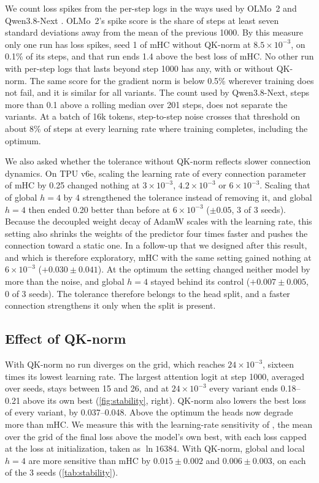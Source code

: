 \documentclass[11pt, a4paper]{article}
\newcommand{\lr}[1]{\ensuremath{#1 \times 10^{-3}}}
\begin{document}
We count loss spikes from the per-step logs in the ways used by OLMo~2 and Qwen3.8-Next \citep{olmo2024olmo2, qiu2026qwen38next}.
OLMo~2's spike score is the share of steps at least seven standard deviations away from the mean of the previous 1000. By this
measure only one run has loss spikes, seed 1 of mHC without QK-norm at \lr{8.5}, on 0.1\% of its steps, and that run ends 1.4
above the best loss of mHC. No other run with per-step logs that lasts beyond step 1000 has any, with or without QK-norm. The same
score for the gradient norm is below 0.5\% wherever training does not fail, and it is similar for all variants. The count used by
Qwen3.8-Next, steps more than 0.1 above a rolling median over 201 steps, does not separate the variants. At a batch of 16k tokens,
step-to-step noise crosses that threshold on about 8\% of steps at every learning rate where training completes, including the
optimum.

We also asked whether the tolerance without QK-norm reflects slower connection dynamics. On TPU v6e, scaling the learning rate of every
connection parameter of mHC by 0.25 changed nothing at \lr{3}, \lr{4.2} or \lr{6}. Scaling that of global $h = 4$ by 4
strengthened the tolerance instead of removing it, and global $h = 4$ then ended 0.20 better than before at \lr{6} ($\pm 0.05$, 3
of 3 seeds). Because the decoupled weight decay of AdamW scales with the learning rate, this setting also shrinks the weights of
the predictor four times faster and pushes the connection toward a static one. In a follow-up that we designed after this result,
and which is therefore exploratory, mHC with the same setting gained nothing at \lr{6} ($+0.030 \pm 0.041$). At the optimum the setting changed neither model by more than the noise, and
global $h = 4$ stayed behind its control ($+0.007 \pm 0.005$, 0 of 3 seeds). The tolerance therefore belongs to the head split, and
a faster connection strengthens it only when the split is present.

\subsection{Effect of QK-norm}
\label{sec:qknorm}

With QK-norm no run diverges on the grid, which reaches \lr{24}, sixteen times its lowest learning rate. The largest attention logit at step 1000,
averaged over seeds, stays between 15 and 26, and at \lr{24} every variant ends 0.18--0.21 above its own best
(\cref{fig:stability}, right). QK-norm also lowers the best loss of every variant, by 0.037--0.048. Above the optimum the heads
now degrade more than mHC. We measure this with the learning-rate sensitivity of \citet{wortsman2023proxies}, the mean over the grid
of the final loss above the model's own best, with each loss capped at the loss at initialization, taken as $\ln 16384$. With
QK-norm, global and local $h = 4$ are more sensitive than mHC by $0.015 \pm 0.002$ and $0.006 \pm 0.003$, on each of the 3 seeds
(\cref{tab:stability}).
\end{document}
